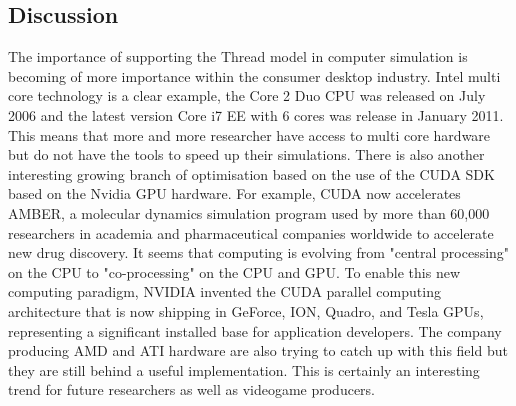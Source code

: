 \subsection{Discussion}
The importance of supporting the Thread model in computer simulation is becoming
of more importance within the consumer desktop industry.
Intel multi core technology is a clear example, the Core 2 Duo CPU was released
on July 2006 and the latest version Core i7 EE with 6 cores was release in January 2011.
This means that more and more researcher have access to multi core hardware
but do not have the tools to speed up their simulations.
There is also another interesting growing branch of optimisation based on the
use of the CUDA SDK based on the Nvidia GPU hardware.
For example, CUDA now accelerates AMBER, a molecular dynamics simulation program
 used by more than 60,000 researchers in academia and pharmaceutical companies
 worldwide to accelerate new drug discovery.
It seems that computing is evolving from "central processing" on the CPU
to "co-processing" on the CPU and GPU. To enable this new computing paradigm,
NVIDIA invented the CUDA parallel computing architecture that is now shipping in
GeForce, ION, Quadro, and Tesla GPUs, representing a significant installed
 base for application developers.
The company producing AMD and ATI hardware are also trying to catch up with 
this field but they are still behind a useful implementation.
This is certainly an interesting trend for future researchers as well as
videogame producers.

